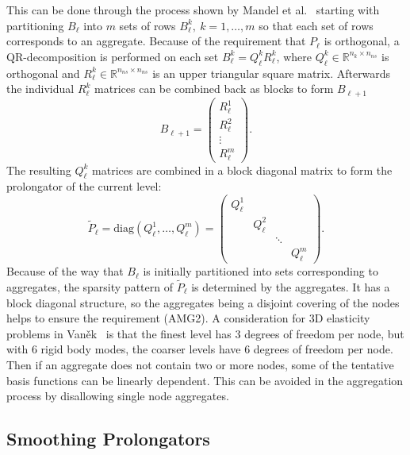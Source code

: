 This can be done through the process shown by Mandel et al.~\cite{Mandel1999} starting with partitioning $B_\ell$ into $m$ sets of rows $B_\ell^k,\ k = 1, \ldots, m$ so that each set of rows corresponds to an aggregate. Because of the requirement that $P_\ell$ is orthogonal, a QR-decomposition is performed on each set $B_\ell^{k} = Q_\ell^k R_\ell^k$, where $Q_\ell^k \in \mathbb{R}^{n_k \times n_{ns}}$ is orthogonal and $R_\ell^k \in \mathbb{R}^{n_{ns} \times n_{ns}}$ is an upper triangular square matrix. Afterwards the individual $R_\ell^k$ matrices can be combined back as blocks to form $B_{\ell+1}$
\begin{equation}
	B_{\ell+1} =
	\begin{pmatrix}
		R_\ell^1 \\
		R_\ell^2 \\
		\vdots \\
		R_\ell^m
	\end{pmatrix}.
\end{equation}
The resulting $Q_\ell^k$ matrices are combined in a block diagonal matrix to form the prolongator of the current level:
\begin{equation}
	\tilde{P}_\ell = \text{diag}\left(Q_\ell^1, \ldots, Q_\ell^m\right) =
	\begin{pmatrix}
		Q_\ell^1 &          &        & \\
		         & Q_\ell^2 &        & \\
				 &          & \ddots & \\
				 &          &        & Q_\ell^m
	\end{pmatrix}.
\end{equation}
Because of the way that $B_\ell$ is initially partitioned into sets corresponding to aggregates, the sparsity pattern of $\tilde{P}_\ell$ is determined by the aggregates. It has a block diagonal structure, so the aggregates being a disjoint covering of the nodes helps to ensure the requirement (AMG2). A consideration for 3D elasticity problems in Van\v{e}k~\cite{Vanek1996} is that the finest level has 3 degrees of freedom per node, but with 6 rigid body modes, the coarser levels have 6 degrees of freedom per node. Then if an aggregate does not contain two or more nodes, some of the tentative basis functions can be linearly dependent. This can be avoided in the aggregation process by disallowing single node aggregates.

\subsection{Smoothing Prolongators}

